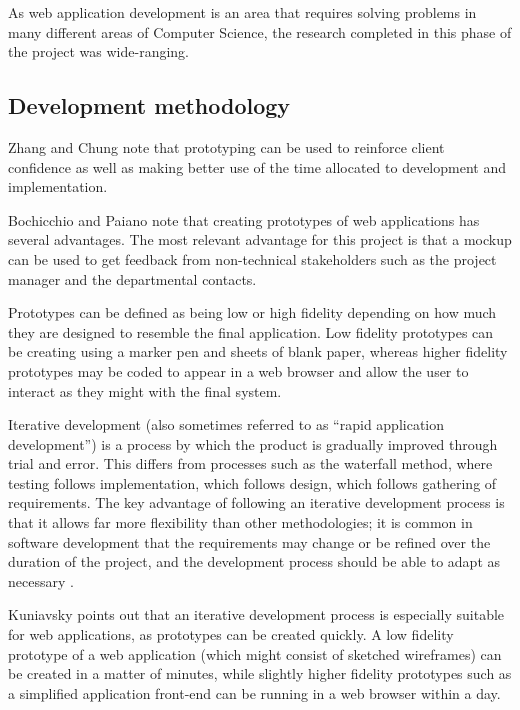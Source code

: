 \documentclass[draft]{scrartcl}
\begin{document}

As web application development is an area that requires solving problems in
many different areas of Computer Science, the research completed in this phase
of the project was wide-ranging.

\subsection{Development methodology}


Zhang and Chung \cite{MODFM_2003} note that prototyping can be used to
reinforce client confidence as well as making better use of the time allocated
to development and implementation.

Bochicchio and Paiano \cite{PrototypingWebApplications_2000} note that
creating prototypes of web applications has several advantages.
The most relevant advantage for this project is that a mockup can be used to
get feedback from non-technical stakeholders such as the project manager and
the departmental contacts.

Prototypes can be defined as being low or high fidelity depending on how much
they are designed to resemble the final application. Low fidelity prototypes
can be creating using a marker pen and sheets of blank paper, whereas higher
fidelity prototypes may be coded to appear in a web browser and allow the user
to interact as they might with the final system.


Iterative development (also sometimes referred to as ``rapid application
development'') is a process by which the product is gradually improved through
trial and error. This differs from processes such as the waterfall method,
where testing follows implementation, which follows design, which follows
gathering of requirements. The key advantage of following an iterative
development process is that it allows far more flexibility than other
methodologies; it is common in software development that the requirements may
change or be refined over the duration of the project, and the development
process should be able to adapt as necessary \cite{kuniavsky2003userexperience}.

Kuniavsky points out that an iterative development process is especially
suitable for web applications, as prototypes can be created quickly. A low
fidelity prototype of a web application (which might consist of sketched
wireframes) can be created in a matter of minutes, while slightly higher
fidelity prototypes such as a simplified application front-end can be running
in a web browser within a day.
\end{document}
